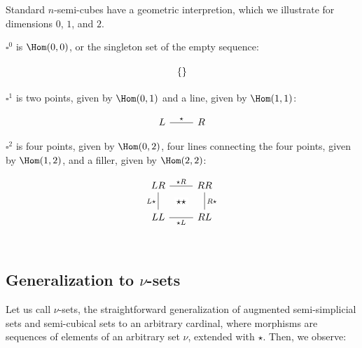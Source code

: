 \documentclass[10pt]{art.cls/art}
\newcommand{\Cube}{\ensuremath{\boldsymbol{\square}}}
\newcommand{\kstar}{{\star}}
\begin{document}
Standard $n$-semi-cubes have a geometric interpretion, which we illustrate for dimensions $0$, $1$, and $2$.

\begin{example}[$\Cube^0$]
  $\Cube^0$ is $\Hom(0, 0)$, or the singleton set of the empty sequence:

  \begin{equation*}
    \begin{tikzcd}
      \{\}
    \end{tikzcd}
  \end{equation*}
\end{example}

\begin{example}[$\Cube^1$]
  $\Cube^1$ is two points, given by $\Hom(0, 1)$ and a line, given by $\Hom(1, 1)$:

  \begin{equation*}
    \begin{tikzcd}
      L \arrow[r, "\kstar", dash] & R
    \end{tikzcd}
  \end{equation*}
\end{example}

\begin{example}[$\Cube^2$]
  $\Cube^2$ is four points, given by $\Hom(0, 2)$, four lines connecting the four points, given by $\Hom(1, 2)$, and a filler, given by $\Hom(2, 2)$:

  \begin{equation*}
    \begin{tikzcd}
      LR \arrow[r, dash, "\kstar R"{name=F}] \arrow[d, dash, "L\kstar" left] & RR \arrow[d, dash, "R\kstar"] \\
      LL \arrow[r, dash, "\kstar L"{name=T, below}] & RL \\
      \arrow[rightarrow, from=F, to=T, phantom, "\kstar\kstar" description]
    \end{tikzcd}
  \end{equation*}
\end{example}

\subsection{Generalization to \texorpdfstring{$\nu$}{ν}-sets}
Let us call $\nu$-sets, the straightforward generalization of augmented semi-simplicial sets and semi-cubical sets to an arbitrary cardinal, where morphisms are sequences of elements of an arbitrary set $\nu$, extended with $\kstar$. Then, we observe:
\end{document}
